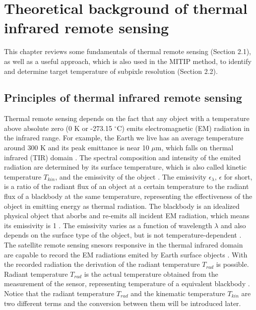 \chapter{Theoretical background of thermal infrared remote sensing}

\label{Chapter2}

This chapter reviews some fundamentals of thermal remote sensing (Section 2.1), as well as a useful approach, which is also used in the MITIP method, to identify and determine target temperature of subpixle resolution (Section 2.2). \\


\section{Principles of thermal infrared remote sensing}
Thermal remote sensing depends on the fact that any object with a temperature above absolute zero (0 K or -273.15 $^\circ$C) emits electromagnetic (EM) radiation in the infrared range. For example, the Earth we live has an average temperature around 300 K and its peak emittance is near 10 $\mu$m, which falls on thermal infrared (TIR) domain \parencite {Reference201, Reference202}. The spectral composition and intensity of the emited radiation are determined by its surface temperature, which is also called kinetic temperature $T_{kin}$,  and the emissivity of the object \parencite{Reference207}. The emissivity $\epsilon_{\lambda}$, $\epsilon$ for short, is a ratio of the radiant flux of an object at a certain temperature to the radiant flux of a blackbody at the same temperature, representing the effectiveness of the object in emitting energy as thermal radiation. The blackbody is an idealized physical object that aborbs and re-emits all incident EM radiation, which means its emissivity is 1 \parencite{Reference206, Reference204}. The emissivity varies as a function of wavelength $\lambda$ and also depends on the surface type of the object, but is not temperature-dependent \parencite{Reference203}.\\

The satellite remote sensing snesors responsive in the thermal infrared domain are capable to record the EM radiations emited by Earth surface objects \parencite{Reference204}. With the recorded radiation the derivation of the radiant temperature $T_{rad}$ is possible. Radiant temperature $T_{rad}$ is the actual temperature obtained from the measurement of the sensor, representing temperature of a equivalent blackbody \parencite{Reference206}. Notice that the radiant temperature $T_{rad}$ and the kinematic temperature $T_{kin}$ are two different terms and the conversion between them will be introduced later.\\

